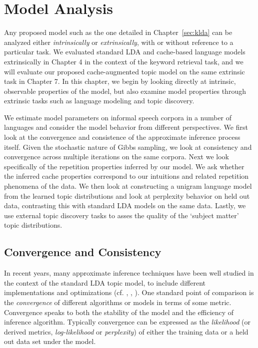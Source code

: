 \chapter{Model Analysis}
\label{sec:kldaAnalysis}

Any proposed model such as the one detailed in Chapter~\ref{sec:klda} can be analyzed either \textit{intrinsically} or \textit{extrinsically}, with or without reference to a particular task.   We evaluated standard LDA and cache-based language models extrinsically in Chapter 4 in the context of the keyword retrieval task, and we will evaluate our proposed cache-augmented topic model on the same extrinsic task in Chapter 7.  In this chapter, we begin by looking directly at intrinsic, observable properties of the model, but also examine model properties through extrinsic tasks such as language modeling and topic discovery.

We estimate model parameters on informal speech corpora in a number of languages and consider the model behavior from different perspectives.  We first look at the convergence and consistence of the approximate inference process itself.  Given the stochastic nature of Gibbs sampling, we look at consistency and convergence across multiple iterations on the same corpora.  Next we look specifically of the repetition properties inferred by our model.  We ask whether the inferred cache properties correspond to our intuitions and related repetition phenomena of the data.   We then look at constructing a unigram language model from the learned topic distributions and look at perplexity behavior on held out data, contrasting this with standard LDA models on the same data.  Lastly, we use external topic discovery tasks to asses the quality of the `subject matter' topic distributions.


\section{Convergence and Consistency}

In recent years, many approximate inference techniques have been well studied in the context of the standard LDA topic model, to include different implementations and optimizations (cf. \cite{hoffman2010online}, \cite{zhai2012mr}, \cite{yao2009efficient}).  One standard point of comparison is the \textit{convergence} of different algorithms or models in terms of some metric.  Convergence speaks to both the stability of the model and the efficiency of inference algorithm.  Typically convergence can be expressed as the \textit{likelihood} (or derived metrics, \textit{log-likelihood} or \textit{perplexity}) of either the training data or a held out data set under the model.

